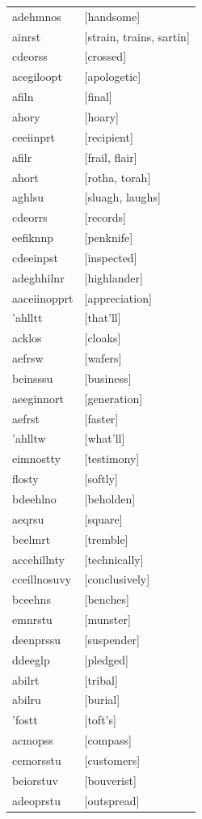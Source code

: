 \documentclass{article}
\begin{document}
\begin{tabular}{ll}
adehmnos & [handsome] \\
ainrst & [strain, trains, sartin] \\
cdeorss & [crossed] \\
acegiloopt & [apologetic] \\
afiln & [final] \\
ahory & [hoary] \\
ceeiinprt & [recipient] \\
afilr & [frail, flair] \\
ahort & [rotha, torah] \\
aghlsu & [sluagh, laughs] \\
cdeorrs & [records] \\
eefiknnp & [penknife] \\
cdeeinpst & [inspected] \\
adeghhilnr & [highlander] \\
aaceiinopprt & [appreciation] \\
'ahlltt & [that'll] \\
acklos & [cloaks] \\
aefrsw & [wafers] \\
beinsssu & [business] \\
aeeginnort & [generation] \\
aefrst & [faster] \\
'ahlltw & [what'll] \\
eimnostty & [testimony] \\
flosty & [softly] \\
bdeehlno & [beholden] \\
aeqrsu & [square] \\
beelmrt & [tremble] \\
accehillnty & [technically] \\
cceillnosuvy & [conclusively] \\
bceehns & [benches] \\
emnrstu & [munster] \\
deenprssu & [suspender] \\
ddeeglp & [pledged] \\
abilrt & [tribal] \\
abilru & [burial] \\
'fostt & [toft's] \\
acmopss & [compass] \\
cemorsstu & [customers] \\
beiorstuv & [bouverist] \\
adeoprstu & [outspread] \\

\end{tabular}
\end{document}
